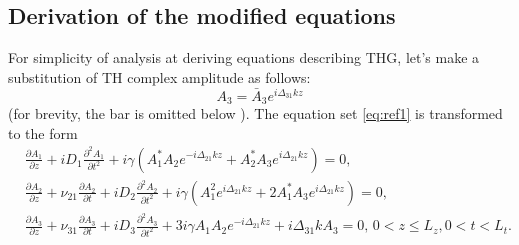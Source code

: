 \documentclass[a4paper, 12pt, onecolumn]{extarticle}
\begin{document}
\subsection*{Derivation of the modified  equations}
For simplicity of  analysis at deriving equations describing THG, let's make a substitution of TH complex amplitude as follows:
$$
{A}_3=\bar{A}_3e^{i\Delta_{31}kz}
$$
(for brevity, the bar is omitted below ). The equation set \eqref{eq:ref1} is transformed to the form
\begin{equation}
\label{eq:refg}
\begin{aligned}
&\frac{\partial{A_1}}{\partial{z}}+iD_1\frac{\partial^2{A_1}}{\partial{t^2}}+i\gamma\left(A_1^* A_2e^{-i\Delta_{21} kz}+A_2^* A_3e^{i\Delta_{21}kz}\right)=0,\\
&\frac{\partial{A_2}}{\partial{z}}+\nu_{21}\frac{\partial A_2}{\partial t}+iD_2\frac{\partial^2{A_2}}{\partial{t^2}}+i\gamma\left(A_1^2e^{i\Delta_{21} kz}+2A_1^*A_3e^{i\Delta_{21}kz}\right)=0,\\
&\frac{\partial{A_3}}{\partial{z}}+\nu_{31}\frac{\partial A_3}{\partial t}+iD_3\frac{\partial^2{A_3}}{\partial{t^2}}+3i\gamma A_1 A_2e^{-i\Delta_{21}kz}+i\Delta_{31}kA_3=0,\,0< z \leq L_z , 0<t<L_t.\\
\end{aligned}
\end{equation}
\end{document}
